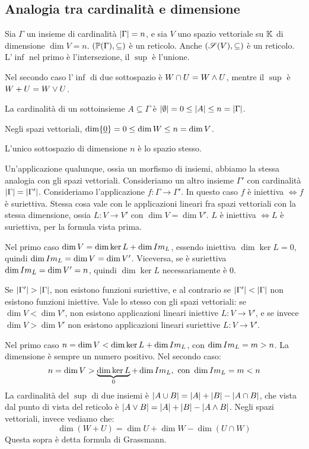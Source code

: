 \subsection{Analogia tra cardinalit\`a e dimensione}

Sia $\Gamma$ un insieme di cardinalit\`a $\left\lvert{\Gamma}\right\rvert = n$, e sia $V$ uno spazio vettoriale su $\mathbb{K}$ di dimensione $\dim V = n$. $(\mathbb{P}(\Gamma), \subseteq)$ \`e un reticolo. Anche $(\mathscr{S}(V), \subseteq)$ \`e un reticolo. L'$\inf$ nel primo \`e l'intersezione, il $\sup$ \`e l'unione.

Nel secondo caso l'$\inf$ di due sottospazio \`e $W \cap U = W \wedge U$, mentre il $\sup$ \`e $W + U = W \vee U$.

La cardinalit\`a di un sottoinsieme $A \subseteq \Gamma$ \`e $\left\lvert{\emptyset}\right\rvert = 0 \le \left\lvert{A}\right\rvert \le n = \left\lvert{\Gamma}\right\rvert$.

Negli spazi vettoriali, $\dim \{ \underline{0}\} = 0 \le \dim W \le n = \dim V$.

L'unico sottospazio di dimensione $n$ \`e lo spazio stesso.

Un'applicazione qualunque, ossia un morfismo di insiemi, abbiamo la stessa analogia con gli spazi vettoriali. Consideriamo un altro insieme $\Gamma'$ con cardinalit\`a $\left\lvert{\Gamma}\right\rvert = \left\lvert{\Gamma'}\right\rvert$. Consideriamo l'applicazione $f : \Gamma \to \Gamma'$. In questo caso $f$ \`e iniettiva $\iff f$ \`e suriettiva. Stessa cosa vale con le applicazioni lineari fra spazi vettoriali con la stessa dimensione, ossia $L : V \to V'$ con $\dim V = \dim V'$. $L$ \`e iniettiva $\iff L$ \`e suriettiva, per la formula vista prima. 

Nel primo caso $\dim V = \dim \ker L + \dim Im_{L}$, essendo iniettiva $\dim \ker L = 0$, quindi $\dim Im_{L} = \dim V = \dim V'$. Viceversa, se \`e suriettiva $\dim Im_{L} = \dim V' = n$, quindi $\dim \ker L$ necessariamente \`e 0.

Se $\left\lvert{\Gamma'}\right\rvert > \left\lvert{\Gamma}\right\rvert$, non esistono funzioni suriettive, e al contrario se $\left\lvert{\Gamma'}\right\rvert < \left\lvert{\Gamma}\right\rvert$ non esistono funzioni iniettive. Vale lo stesso con gli spazi vettoriali: se $\dim V < \dim V'$, non esistono applicazioni lineari iniettive $L : V \to V'$, e se invece $\dim V > \dim V'$ non esistono applicazioni lineari suriettive $L : V \to V'$.

Nel primo caso $n = \dim V < \dim \ker L + \dim Im_{L}$, con $\dim Im_{L} = m > n$. La dimensione \`e sempre un numero positivo. Nel secondo caso:
\[
n = \dim V > \underbrace{\dim \ker L}_{0} + \dim Im_{L}, \text{ con } \dim Im_{L} = m < n
\]
La cardinalit\`a del $\sup$ di due insiemi \`e $\left\lvert{A \cup B}\right\rvert = \left\lvert{A}\right\rvert + \left\lvert{B}\right\rvert - \left\lvert{A \cap B}\right\rvert$, che vista dal punto di vista del reticolo \`e $\left\lvert{A \vee B}\right\rvert = \left\lvert{A}\right\rvert + \left\lvert{B}\right\rvert - \left\lvert{A \wedge B}\right\rvert$. Negli spazi vettoriali, invece vediamo che:
\[
\dim (W + U) = \dim U + \dim W - \dim (U \cap W)
\]
Questa sopra \`e detta formula di Grassmann.

